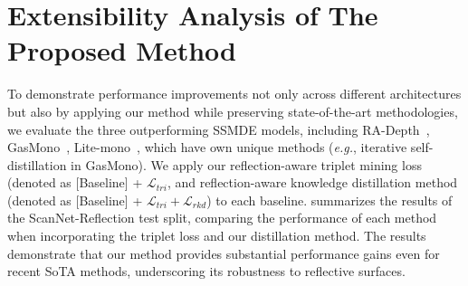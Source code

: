 \section{Extensibility Analysis of The Proposed Method}
To demonstrate performance improvements not only across different architectures but also by applying our method while preserving state-of-the-art methodologies, we evaluate the three outperforming SSMDE models, including RA-Depth~\citep{he2022ra}, GasMono~\citep{zhao2023gasmono}, Lite-mono~\citep{zhang2023lite}, which have own unique methods (\textit{e.g.}, iterative self-distillation in GasMono).
We apply our reflection-aware triplet mining loss (denoted as [Baseline] + $\mathcal{L}_{tri}$, and reflection-aware knowledge distillation method (denoted as [Baseline] + $\mathcal{L}_{tri} + \mathcal{L}_{rkd}$) to each baseline.
 summarizes the results of the ScanNet-Reflection test split, comparing the performance of each method when incorporating the triplet loss and our distillation method.
The results demonstrate that our method provides substantial performance gains even for recent SoTA methods, underscoring its robustness to reflective surfaces.


